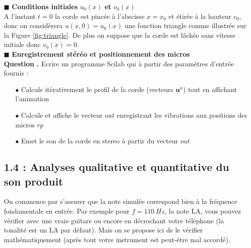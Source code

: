 \documentclass[a4,12pt]{article}
\newcommand{\ub}{\mathbf{u}}
\newcounter{Nbquestion}
\newcommand*\question{%
\stepcounter{Nbquestion}%
\textbf{Question \theNbquestion. }}
\begin{document}

    \hspace{0.5cm} $\blacksquare$ \textbf{Conditions initiales} $u_0(x)$ \textbf{et} $v_0(x)$\\

    A l'instant $t=0$ la corde est pincée à l'abscisse $x=x_0$ et étirée à la hauteur $c_0$, donc on considèrera $u(x,0)=u_0(x)$ une fonction triangle comme illustrée sur la Figure \ref{fig:triangle}. De plus on suppose que la corde est lâchée sans vitesse initiale donc $v_0(x)=0$.\\

    \hspace{0.5cm} $\blacksquare$ \textbf{Enregistrement stéréo et positionnement des micros}\\


    \question Ecrire un programme Scilab qui à partir des paramètres d'entrée fournis : \\

    \begin{itemize}
    \item[$\bullet$] Calcule itérativement le profil de la corde (vecteurs $\ub^n$) tout en affichant l'animation\\
        \item[$\bullet$] Calcule et affiche le vecteur $out$ enregistrant les vibrations aux positions des micros $rp$\\ 	\item[$\bullet$] Emet le son de la corde en stereo à partir du vecteur $out$
        \end{itemize}


        \subsection*{1.4 : Analyses qualitative et quantitative du son produit}

        On commence par s'assurer que la note simulée correspond bien à la fréquence fondamentale en entrée. Par exemple pour $f=110~Hz$, la note LA, vous pouvez vérifier avec une vraie guitare ou encore en décrochant votre téléphone (la tonalité est un LA par défaut). Mais on se propose ici de le vérifier mathématiquement (après tout votre instrument est peut-être mal accordé). 

\end{document}
